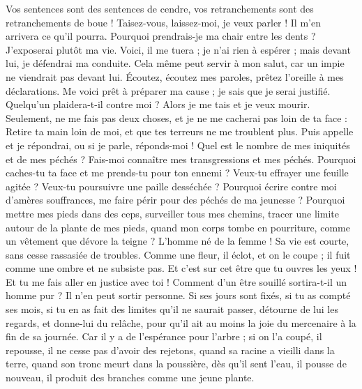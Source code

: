 \begin{multicols}{2}
Vos sentences sont des sentences de cendre, vos retranchements sont des retranchements de boue !
Taisez-vous, laissez-moi, je veux parler ! Il m'en arrivera ce qu'il pourra.
Pourquoi prendrais-je ma chair entre les dents ? J'exposerai plutôt ma vie.
Voici, il me tuera ; je n'ai rien à espérer ; mais devant lui, je défendrai ma conduite.
Cela même peut servir à mon salut, car un impie ne viendrait pas devant lui.
Écoutez, écoutez mes paroles, prêtez l'oreille à mes déclarations.
Me voici prêt à préparer ma cause ; je sais que je serai justifié.
Quelqu'un plaidera-t-il contre moi ? Alors je me tais et je veux mourir.
Seulement, ne me fais pas deux choses, et je ne me cacherai pas loin de ta face :
Retire ta main loin de moi, et que tes terreurs ne me troublent plus.
Puis appelle et je répondrai, ou si je parle, réponds-moi !
Quel est le nombre de mes iniquités et de mes péchés ? Fais-moi connaître mes transgressions et mes péchés.
Pourquoi caches-tu ta face et me prends-tu pour ton ennemi ?
Veux-tu effrayer une feuille agitée ? Veux-tu poursuivre une paille desséchée ?
Pourquoi écrire contre moi d'amères souffrances, me faire périr pour des péchés de ma jeunesse ?
Pourquoi mettre mes pieds dans des ceps, surveiller tous mes chemins, tracer une limite autour de la plante de mes pieds,
quand mon corps tombe en pourriture, comme un vêtement que dévore la teigne ?
\VerseOne{}L'homme né de la femme ! Sa vie est courte, sans cesse rassasiée de troubles.
Comme une fleur, il éclot, et on le coupe ; il fuit comme une ombre et ne subsiste pas.
Et c'est sur cet être que tu ouvres les yeux ! Et tu me fais aller en justice avec toi !
Comment d'un être souillé sortira-t-il un homme pur ? Il n'en peut sortir personne.
Si ses jours sont fixés, si tu as compté ses mois, si tu en as fait des limites qu'il ne saurait passer,
détourne de lui les regards, et donne-lui du relâche, pour qu'il ait au moins la joie du mercenaire à la fin de sa journée.
Car il y a de l'espérance pour l'arbre ; si on l'a coupé, il repousse, il ne cesse pas d'avoir des rejetons,
quand sa racine a vieilli dans la terre, quand son tronc meurt dans la poussière,
dès qu'il sent l'eau, il pousse de nouveau, il produit des branches comme une jeune plante.

\end{multicols}
